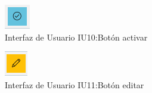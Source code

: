 \begin{figure}[htbp!]
	\begin{center}
\includegraphics[width=\textwidth]{Pantallas/bottonActivar}
		\caption{Interfaz de Usuario IU10:Botón activar}
	\end{center}
\end{figure}



\begin{figure}[htbp!]
	\begin{center}
\includegraphics[width=\textwidth]{Pantallas/botonEditar}
		\caption{Interfaz de Usuario IU11:Botón editar}
	\end{center}
\end{figure}




